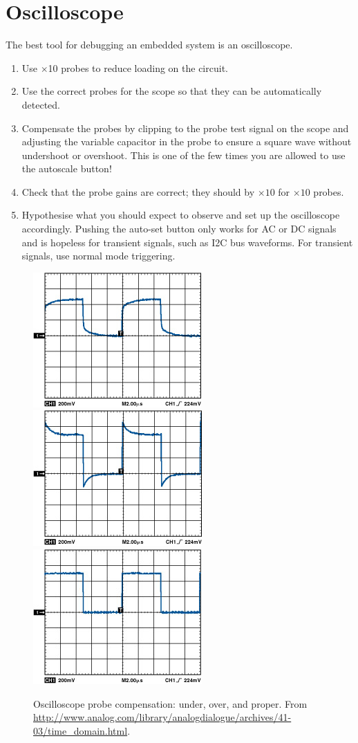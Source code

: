\section{Oscilloscope}
\label{oscilloscope}

The best tool for debugging an embedded system is an oscilloscope.

\begin{enumerate}
\item  Use $\times$10 probes to reduce loading on the circuit.

\item Use the correct probes for the scope so that they can be automatically
  detected.

\item Compensate the probes by clipping to the probe test signal on
  the scope and adjusting the variable capacitor in the probe to
  ensure a square wave without undershoot or overshoot. This is one of
  the few times you are allowed to use the autoscale button!

\item Check that the probe gains are correct; they should by $\times
  10$ for $\times 10$ probes.

\item Hypothesise what you should expect to observe and set up the
  oscilloscope accordingly.  Pushing the auto-set button only works
  for AC or DC signals and is hopeless for transient signals, such as
  I2C bus waveforms.  For transient signals, use normal mode triggering.

\end{enumerate}

\begin{figure}[!h]
  \centering
  \includegraphics[width=0.3\columnwidth]{figs/probe-undercompensated}
  \includegraphics[width=0.3\columnwidth]{figs/probe-overcompensated}
  \includegraphics[width=0.3\columnwidth]{figs/probe-compensated}
  \caption{Oscilloscope probe compensation: under, over, and proper.
    From
    \url{http://www.analog.com/library/analogdialogue/archives/41-03/time_domain.html}.}
\end{figure}


